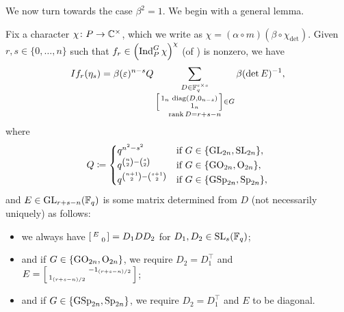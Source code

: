 
We now turn towards the case $\beta^2=1$. We begin with a general lemma.
\begin{lemma} \label{lem:matrix-coeff}
	Fix a character $\chi\colon P\to\mathbb C^\times$, which we write as $\chi=(\alpha\circ m)(\beta\circ\chi_{\det})$. Given $r,s\in\{0,\ldots,n\}$ such that $f_r\in\left(\operatorname{Ind}_P^G\chi\right)^\chi$ (of ) is nonzero, we have %
	\[If_r(\eta_s)=\beta(\varepsilon)^{n-s}Q\sum_{\substack{D\in\mathbb F_q^{s\times s}\\\begin{bsmallmatrix}
		1_n & \operatorname{diag}(D,0_{n-s}) \\ & 1_n
	\end{bsmallmatrix}\in G\\\operatorname{rank}D=r+s-n}}\beta(\det E)^{-1},\]
	where
	\[Q\coloneqq\begin{cases}
		q^{n^2-s^2} & \text{if }G\in\{\mathrm{GL}_{2n},\mathrm{SL}_{2n}\}, \\
		q^{\binom{n}2-\binom{s}2} & \text{if }G\in\{\mathrm{GO}_{2n},\mathrm{O}_{2n}\}, \\
		q^{\binom{n+1}2-\binom{s+1}2} & \text{if }G\in\{\mathrm{GSp}_{2n},\mathrm{Sp}_{2n}\},
	\end{cases}\]
	and $E\in\mathrm{GL}_{r+s-n}(\mathbb F_q)$ is some matrix determined from $D$ (not necessarily uniquely) as follows:
    \begin{itemize}
        \item we always have $\begin{bsmallmatrix}
    		E \\ & 0
    	\end{bsmallmatrix}=D_1DD_2$ for $D_1,D_2\in\mathrm{SL}_s(\mathbb F_q)$;
        \item and if $G\in\{\mathrm{GO}_{2n},\mathrm{O}_{2n}\}$, we require $D_2=D_1^\intercal$ and $E=\begin{bsmallmatrix}
            & -1_{(r+s-n)/2} \\ 1_{(r+s-n)/2}
        \end{bsmallmatrix}$;
        \item and if $G\in\{\mathrm{GSp}_{2n},\mathrm{Sp}_{2n}\}$, we require $D_2=D_1^\intercal$ and $E$ to be diagonal.
    \end{itemize}
\end{lemma}
